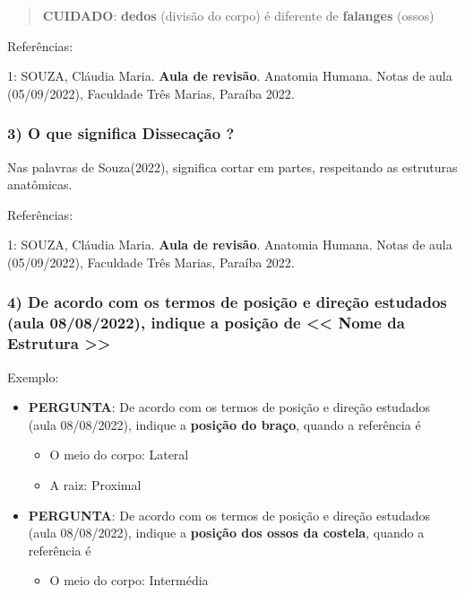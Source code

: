 \documentclass[
]{book}
\providecommand{\tightlist}{%
  \setlength{\itemsep}{0pt}\setlength{\parskip}{0pt}}
\begin{document}
\begin{quote}
\textbf{CUIDADO}: \textbf{dedos} (divisão do corpo) é diferente de \textbf{falanges} (ossos)
\end{quote}

Referências:

1: SOUZA, Cláudia Maria. \textbf{Aula de revisão}. Anatomia Humana. Notas de aula (05/09/2022), Faculdade Três Marias, Paraíba 2022.

\hypertarget{o-que-significa-dissecauxe7uxe3o}{%
\subsubsection*{3) O que significa Dissecação ?}\label{o-que-significa-dissecauxe7uxe3o}}

Nas palavras de Souza(2022), significa cortar em partes, respeitando as estruturas anatômicas.

Referências:

1: SOUZA, Cláudia Maria. \textbf{Aula de revisão}. Anatomia Humana. Notas de aula (05/09/2022), Faculdade Três Marias, Paraíba 2022.

\hypertarget{de-acordo-com-os-termos-de-posiuxe7uxe3o-e-direuxe7uxe3o-estudados-aula-08082022-indique-a-posiuxe7uxe3o-de-nome-da-estrutura}{%
\subsubsection*{4) De acordo com os termos de posição e direção estudados (aula 08/08/2022), indique a posição de \textless\textless{} Nome da Estrutura \textgreater\textgreater{}}\label{de-acordo-com-os-termos-de-posiuxe7uxe3o-e-direuxe7uxe3o-estudados-aula-08082022-indique-a-posiuxe7uxe3o-de-nome-da-estrutura}}

Exemplo:

\begin{itemize}
\tightlist
\item
  \textbf{PERGUNTA}: De acordo com os termos de posição e direção estudados (aula 08/08/2022), indique a \textbf{posição do braço}, quando a referência é

  \begin{itemize}
  \tightlist
  \item
    O meio do corpo: Lateral
  \item
    A raiz: Proximal
  \end{itemize}
\item
  \textbf{PERGUNTA}: De acordo com os termos de posição e direção estudados (aula 08/08/2022), indique a \textbf{posição dos ossos da costela}, quando a referência é

  \begin{itemize}
  \tightlist
  \item
    O meio do corpo: Intermédia
  \end{itemize}
\end{itemize}
\end{document}
